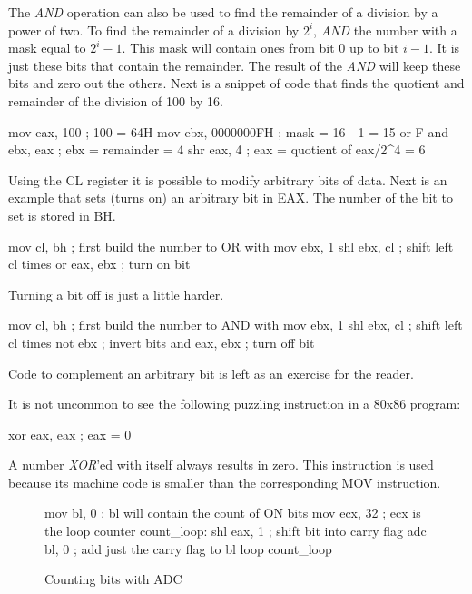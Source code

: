 The \emph{AND} operation can also be used to find the remainder of a
division by a power of two. To find the remainder of a division by
$2^i$, \emph{AND} the number with a mask equal to $2^i - 1$. This mask will
contain ones from bit 0 up to bit $i-1$. It is just these bits that contain
the remainder. The result of the \emph{AND} will keep these bits and
zero out the others. Next is a snippet of code that finds the quotient and
remainder of the division of 100 by 16.
\begin{AsmCodeListing}[frame=none]
      mov    eax, 100        ; 100 = 64H
      mov    ebx, 0000000FH  ; mask = 16 - 1 = 15 or F
      and    ebx, eax        ; ebx = remainder = 4
      shr    eax, 4          ; eax = quotient of eax/2^4 = 6
\end{AsmCodeListing}
Using the {\code CL} register it is possible to modify arbitrary bits of data.
Next is an example that sets (turns on) an arbitrary bit in {\code EAX}. The
number of the bit to set is stored in {\code BH}.
\begin{AsmCodeListing}[frame=none]
      mov    cl, bh          ; first build the number to OR with
      mov    ebx, 1
      shl    ebx, cl         ; shift left cl times
      or     eax, ebx        ; turn on bit
\end{AsmCodeListing}
Turning a bit off is just a little harder.
\begin{AsmCodeListing}[frame=none]
      mov    cl, bh          ; first build the number to AND with
      mov    ebx, 1
      shl    ebx, cl         ; shift left cl times
      not    ebx             ; invert bits
      and    eax, ebx        ; turn off bit
\end{AsmCodeListing}
Code to complement an arbitrary bit is left as an exercise for the reader.

It is not uncommon to see the following puzzling instruction in a 80x86
program:
\begin{AsmCodeListing}[frame=none,numbers=none]
      xor    eax, eax         ; eax = 0
\end{AsmCodeListing}
A number \emph{XOR}'ed with itself always results in zero. This instruction
is used because its machine code is smaller than the corresponding 
{\code MOV} instruction.

\begin{figure}[t]
\begin{AsmCodeListing}
      mov    bl, 0           ; bl will contain the count of ON bits
      mov    ecx, 32         ; ecx is the loop counter
count_loop:
      shl    eax, 1          ; shift bit into carry flag
      adc    bl, 0           ; add just the carry flag to bl
      loop   count_loop
\end{AsmCodeListing}
\caption{Counting bits with {\code ADC}\label{fig:countBitsAdc}}
\end{figure}

